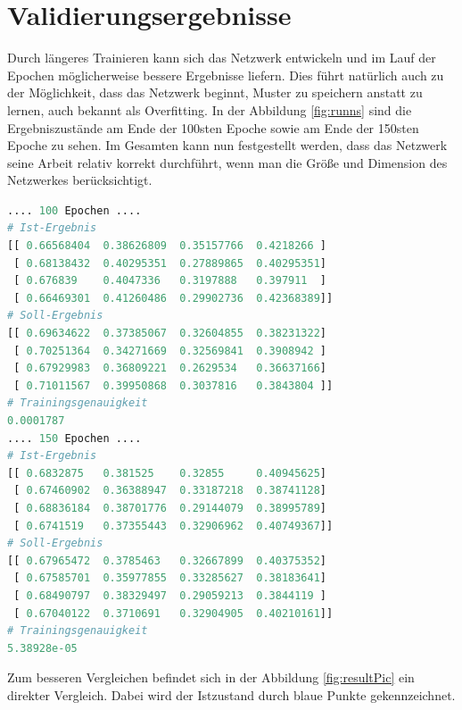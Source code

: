 \section{Validierungsergebnisse}

Durch längeres Trainieren kann sich das Netzwerk entwickeln und im Lauf der Epochen möglicherweise bessere Ergebnisse liefern. 
Dies führt natürlich auch zu der Möglichkeit, dass das Netzwerk beginnt, Muster zu speichern anstatt zu lernen, auch bekannt als Overfitting. 
In der Abbildung \ref{fig:runns} sind die Ergebniszustände am Ende der 100sten Epoche sowie am Ende der 150sten Epoche zu sehen. 
Im Gesamten kann nun festgestellt werden, dass das Netzwerk seine Arbeit relativ korrekt durchführt, wenn man die Größe und Dimension des Netzwerkes berücksichtigt. 
\begin{lstlisting}[caption={Ergebnisse am Ende der 100sten Epoche und am Ende der 150sten Epoche},label=fig:runns,captionpos=b,language=Python]
.... 100 Epochen ....
# Ist-Ergebnis 
[[ 0.66568404  0.38626809  0.35157766  0.4218266 ]
 [ 0.68138432  0.40295351  0.27889865  0.40295351]
 [ 0.676839    0.4047336   0.3197888   0.397911  ]
 [ 0.66469301  0.41260486  0.29902736  0.42368389]]
# Soll-Ergebnis
[[ 0.69634622  0.37385067  0.32604855  0.38231322]
 [ 0.70251364  0.34271669  0.32569841  0.3908942 ]
 [ 0.67929983  0.36809221  0.2629534   0.36637166]
 [ 0.71011567  0.39950868  0.3037816   0.3843804 ]]
# Trainingsgenauigkeit
0.0001787
.... 150 Epochen ....
# Ist-Ergebnis
[[ 0.6832875   0.381525    0.32855     0.40945625]
 [ 0.67460902  0.36388947  0.33187218  0.38741128]
 [ 0.68836184  0.38701776  0.29144079  0.38995789]
 [ 0.6741519   0.37355443  0.32906962  0.40749367]]
# Soll-Ergebnis
[[ 0.67965472  0.3785463   0.32667899  0.40375352]
 [ 0.67585701  0.35977855  0.33285627  0.38183641]
 [ 0.68490797  0.38329497  0.29059213  0.3844119 ]
 [ 0.67040122  0.3710691   0.32904905  0.40210161]]
# Trainingsgenauigkeit
5.38928e-05
\end{lstlisting}
Zum besseren Vergleichen befindet sich in der Abbildung \ref{fig:resultPic} ein direkter Vergleich. 
Dabei wird der Istzustand durch blaue Punkte gekennzeichnet. 
